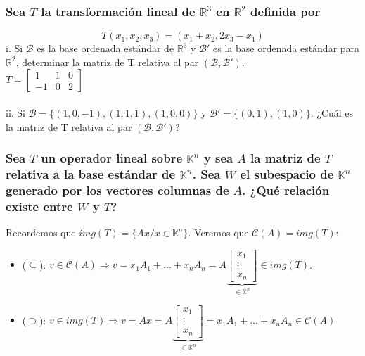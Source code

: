\documentclass{article}
\begin{document}
\subsubsection{Sea $T$ la transformación lineal de $\mathbb{R}^3$ en $\mathbb{R}^2$ definida por}
\[
T(x_1,x_2,x_3) = (x_1+x_2,2x_3-x_1)
\]
i. Si $\mathcal{B}$ es la base ordenada estándar de $\mathbb{R}^3$ y $\mathcal{B}'$ es la base ordenada estándar para
$\mathbb{R}^2$, determinar la matriz de T relativa al par $(\mathcal{B},\mathcal{B}')$. \\
$T = \begin{bmatrix} 1&1&0 \\ -1&0&2\end{bmatrix}$
\\ \\
ii. Si $\mathcal{B} = \{ (1,0,-1),(1,1,1),(1,0,0) \}$ y $\mathcal{B}' = \{ (0,1),(1,0) \}$. ¿Cuál es la matriz de T relativa
al par $(\mathcal{B},\mathcal{B'})$?

\subsubsection{Sea $T$ un operador lineal sobre $\mathbb{K}^n$ y sea $A$ la matriz de $T$ relativa a la base estándar de
$\mathbb{K}^n$. Sea $W$ el subespacio de $\mathbb{K}^n$ generado por los vectores columnas de $A$. ¿Qué relación existe
entre $W$ y $T$?}
Recordemos que $img(T) = \{ Ax / x \in \mathbb{K}^n \}$. Veremos que $\mathcal{C}(A) = img(T)$:
\begin{itemize}
\item
	($\subseteq$): $v \in \mathcal{C}(A) \Rightarrow v = x_1A_1+\dots+x_nA_n =
	A \underbrace{\begin{bmatrix} x_1\\ \vdots \\ x_n \end{bmatrix}}_{\in \mathbb{K}^n} \in img(T)$.
\item
	($\supset$): $v \in img(T) \Rightarrow v = Ax = 
	A \underbrace{\begin{bmatrix} x_1 \\ \vdots \\ x_n \end{bmatrix}}_{\in \mathbb{K}^n} = x_1A_1+\dots+x_nA_n \in
	\mathcal{C}(A)$
\end{itemize}
\end{document}
